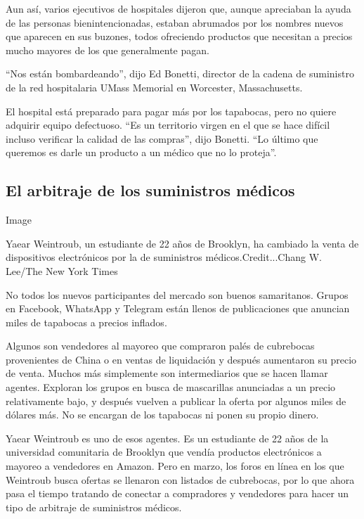 Aun así, varios ejecutivos de hospitales dijeron que, aunque apreciaban
la ayuda de las personas bienintencionadas, estaban abrumados por los
nombres nuevos que aparecen en sus buzones, todos ofreciendo productos
que necesitan a precios mucho mayores de los que generalmente pagan.

``Nos están bombardeando'', dijo Ed Bonetti, director de la cadena de
suministro de la red hospitalaria UMass Memorial en Worcester,
Massachusetts.

El hospital está preparado para pagar más por los tapabocas, pero no
quiere adquirir equipo defectuoso. ``Es un territorio virgen en el que
se hace difícil incluso verificar la calidad de las compras'', dijo
Bonetti. ``Lo último que queremos es darle un producto a un médico que
no lo proteja''.

\hypertarget{el-arbitraje-de-los-suministros-muxe9dicos}{%
\subsection{El arbitraje de los suministros
médicos}\label{el-arbitraje-de-los-suministros-muxe9dicos}}

Image

Yaear Weintroub, un estudiante de 22 años de Brooklyn, ha cambiado la
venta de dispositivos electrónicos por la de suministros
médicos.Credit...Chang W. Lee/The New York Times

No todos los nuevos participantes del mercado son buenos samaritanos.
Grupos en Facebook, WhatsApp y Telegram están llenos de publicaciones
que anuncian miles de tapabocas a precios inflados.

Algunos son vendedores al mayoreo que compraron palés de cubrebocas
provenientes de China o en ventas de liquidación y después aumentaron su
precio de venta. Muchos más simplemente son intermediarios que se hacen
llamar agentes. Exploran los grupos en busca de mascarillas anunciadas a
un precio relativamente bajo, y después vuelven a publicar la oferta por
algunos miles de dólares más. No se encargan de los tapabocas ni ponen
su propio dinero.

Yaear Weintroub es uno de esos agentes. Es un estudiante de 22 años de
la universidad comunitaria de Brooklyn que vendía productos electrónicos
a mayoreo a vendedores en Amazon. Pero en marzo, los foros en línea en
los que Weintroub busca ofertas se llenaron con listados de cubrebocas,
por lo que ahora pasa el tiempo tratando de conectar a compradores y
vendedores para hacer un tipo de arbitraje de suministros médicos.

